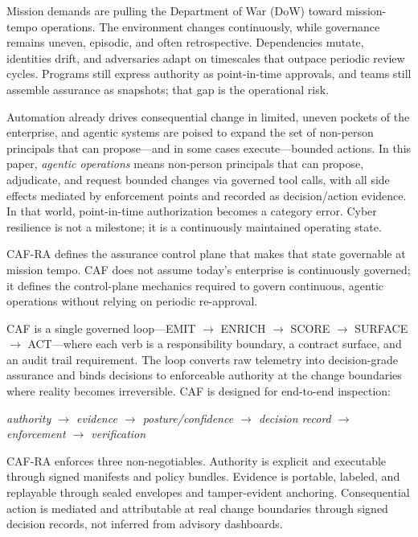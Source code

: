 \documentclass[11pt]{article}
\begin{document}
\makepapercover

{\small\renewcommand{\baselinestretch}{0.96}\selectfont\tableofcontents}
\newpage

\begin{execsummary}
Mission demands are pulling the Department of War (DoW) toward mission-tempo operations. The environment changes continuously, while governance remains uneven, episodic, and often retrospective. Dependencies mutate, identities drift, and adversaries adapt on timescales that outpace periodic review cycles. Programs still express authority as point-in-time approvals, and teams still assemble assurance as snapshots; that gap is the operational risk.

Automation already drives consequential change in limited, uneven pockets of the enterprise, and agentic systems are poised to expand the set of non-person principals that can propose---and in some cases execute---bounded actions. In this paper, \emph{agentic operations} means non-person principals that can propose, adjudicate, and request bounded changes via governed tool calls, with all side effects mediated by enforcement points and recorded as decision/action evidence. In that world, point-in-time authorization becomes a category error. Cyber resilience is not a milestone; it is a continuously maintained operating state.

CAF-RA defines the assurance control plane that makes that state governable at mission tempo. CAF does not assume today's enterprise is continuously governed; it defines the control-plane mechanics required to govern continuous, agentic operations without relying on periodic re-approval.

CAF is a single governed loop---EMIT $\rightarrow$ ENRICH $\rightarrow$ SCORE $\rightarrow$ SURFACE $\rightarrow$ ACT---where each verb is a responsibility boundary, a contract surface, and an audit trail requirement. The loop converts raw telemetry into decision-grade assurance and binds decisions to enforceable authority at the change boundaries where reality becomes irreversible. CAF is designed for end-to-end inspection:

\begin{center}
\textit{authority $\rightarrow$ evidence $\rightarrow$ posture/confidence $\rightarrow$ decision record $\rightarrow$ enforcement $\rightarrow$ verification}
\end{center}

CAF-RA enforces three non-negotiables. Authority is explicit and executable through signed manifests and policy bundles. Evidence is portable, labeled, and replayable through sealed envelopes and tamper-evident anchoring. Consequential action is mediated and attributable at real change boundaries through signed decision records, not inferred from advisory dashboards.


\end{execsummary}
\end{document}
